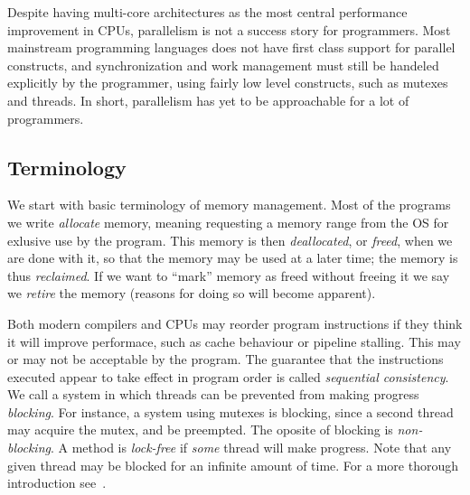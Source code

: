 \documentclass[a4paper,twoside]{article}
\begin{document}
Despite having multi-core architectures as the most central performance
improvement in CPUs, parallelism is not a success story for programmers.
Most mainstream programming languages does not have first class support
for parallel constructs, and synchronization and work management must
still be handeled explicitly by the programmer, using fairly low level
constructs, such as mutexes and threads.
In short, parallelism has yet to be approachable for a lot of programmers.


\subsubsection*{}

\subsection{Terminology}
We start with basic terminology of memory management.
Most of the programs we write \emph{allocate} memory, meaning
requesting a memory range from the OS for exlusive use by the program.
This memory is then \emph{deallocated}, or \emph{freed}, when we are done with it,
so that the memory may be used at a later time;
the memory is thus \emph{reclaimed}.
If we want to ``mark'' memory as freed without freeing it we say we \emph{retire} the memory
(reasons for doing so will become apparent).

Both modern compilers and CPUs may reorder program instructions
if they think it will improve performace, such as cache behaviour
or pipeline stalling. This may or may not be acceptable by
the program. The guarantee that the instructions executed
appear to take effect in program order is called
\emph{sequential consistency}.
We call a system in which threads can be prevented from making
progress \emph{blocking}. For instance, a system using mutexes
is blocking, since a second thread may acquire the mutex,
and be preempted. The oposite of blocking is \emph{non-blocking}.
A method is \emph{lock-free} if \emph{some} thread will make progress.
Note that any given thread may be blocked for an infinite amount of time.
For a more thorough introduction see~\cite{herlihy2011art}.
\end{document}
